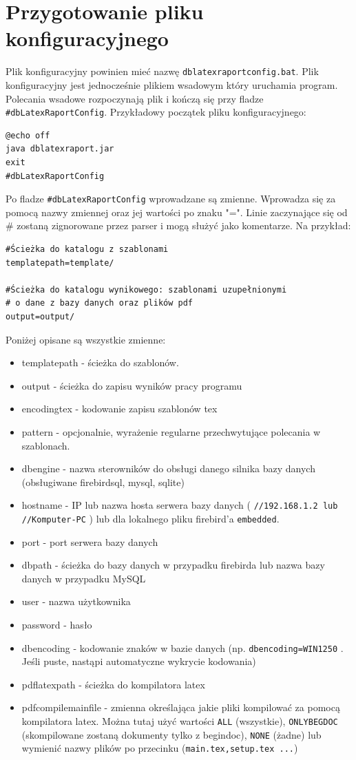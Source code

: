 \section{Przygotowanie pliku konfiguracyjnego}
Plik konfiguracyjny powinien mieć nazwę \texttt{dblatexraportconfig.bat}. Plik konfiguracyjny jest jednocześnie plikiem wsadowym który uruchamia program. Polecania wsadowe rozpoczynają plik i kończą się przy fladze \texttt{\#dbLatexRaportConfig}. Przykładowy początek pliku konfiguracyjnego:
\begin{lstlisting}
@echo off
java dblatexraport.jar
exit
#dbLatexRaportConfig
\end{lstlisting}
Po fladze \texttt{\#dbLatexRaportConfig} wprowadzane są zmienne. Wprowadza się  za pomocą nazwy zmiennej oraz jej wartości po znaku "=". Linie zaczynające się od \# zostaną zignorowane przez parser i mogą służyć jako komentarze. Na przykład:
\begin{lstlisting}
#Ścieżka do katalogu z szablonami
templatepath=template/

#Ścieżka do katalogu wynikowego: szablonami uzupełnionymi
# o dane z bazy danych oraz plików pdf
output=output/
\end{lstlisting}
Poniżej opisane są wszystkie zmienne:\vspace{5mm}
\begin{itemize}

\item templatepath - ścieżka do szablonów.
\item output - ścieżka do zapisu wyników pracy programu
\item  encodingtex - kodowanie zapisu szablonów tex
\item pattern - opcjonalnie, wyrażenie regularne przechwytujące polecania w szablonach.
\item  dbengine - nazwa sterowników do obsługi danego silnika bazy danych (obsługiwane firebirdsql, mysql, sqlite)
\item  hostname - IP lub nazwa hosta serwera bazy danych ( \texttt{//192.168.1.2 lub} \texttt{//Komputer-PC} ) lub dla lokalnego pliku firebird'a \texttt{embedded}.
\item  port - port serwera bazy danych
\item  dbpath - ścieżka do bazy danych w przypadku firebirda lub nazwa bazy danych w przypadku MySQL
\item  user - nazwa użytkownika
\item  password - hasło
\item  dbencoding - kodowanie znaków w bazie danych  (np. \texttt{dbencoding=WIN1250}  . Jeśli puste, nastąpi automatyczne wykrycie kodowania)
\item  pdflatexpath - ścieżka do kompilatora latex
\item  pdfcompilemainfile - zmienna określająca jakie pliki kompilować za pomocą kompilatora latex. Można tutaj użyć wartości \texttt{ALL} (wszystkie), \texttt{ONLYBEGDOC} (skompilowane zostaną dokumenty tylko z begindoc), \texttt{NONE} (żadne) lub wymienić nazwy plików po przecinku (\texttt{main.tex,setup.tex ...})

\end{itemize}


